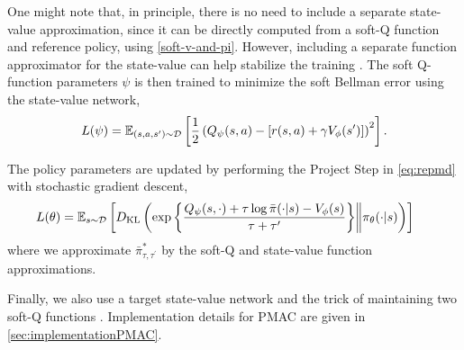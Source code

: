 One might note that, in principle, there is no need to include a 
separate state-value approximation, since it can be directly computed
from a soft-Q function and reference policy, 
using \cref{soft-v-and-pi}.
However, including a separate function approximator for the state-value
can help stabilize the training \citep{haarnoja2018soft}. 
The soft Q-function parameters $\psi$ is then trained to minimize the soft Bellman error using the state-value network,
{\small
\begin{equation}
\label{eq:trainQ}
L(\psi) = \mathbb{E}_{(s,a,s') \sim {\mathcal{D}}} \left[ \frac{1}{2} \left( Q_{\psi}(s,a) - \left[r(s,a) + \gamma V_{\phi}(s') \right] \right)^2 \right].
\end{equation}
}

The policy parameters are updated by performing the Project Step in
\cref{eq:repmd} with stochastic gradient descent,
%
{\small
\begin{equation}
\hspace{-0.5cm}
\label{eq:trainpi}
L(\theta) = \E_{s \sim \gD} \left[ \KL \left( \exp\left\{ \frac{\parQ(s,\cdot) + \tau \log \refPi(\cdot|s) - \parV(s)}{\tau+\tau'} \right\} \middle\Vert \parPi(\cdot |s) \right) \right]
\end{equation}
}
%
where we approximate $\bar{\pi}_{\tau,\tau^{\prime}}^*$ by the soft-Q and state-value function approximations. 

Finally,
we also use a target state-value network \citep{lillicrap2015continuous}
and the trick of maintaining two soft-Q functions
\citep{haarnoja2018soft,fujimoto2018addressing}.
Implementation details for PMAC are given in \cref{sec:implementationPMAC}. 


